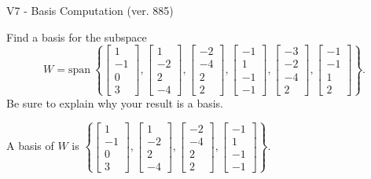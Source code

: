 \begin{exercise}
  \begin{exerciseTitle}V7 - Basis Computation (ver. 885)\end{exerciseTitle}
  \begin{exerciseStatement}
    Find a basis for the subspace 
\[W=\mathrm{span}\ \left\{\left[\begin{array}{r}
1 \\
-1 \\
0 \\
3
\end{array}\right] , \left[\begin{array}{r}
1 \\
-2 \\
2 \\
-4
\end{array}\right] , \left[\begin{array}{r}
-2 \\
-4 \\
2 \\
2
\end{array}\right] , \left[\begin{array}{r}
-1 \\
1 \\
-1 \\
-1
\end{array}\right] , \left[\begin{array}{r}
-3 \\
-2 \\
-4 \\
2
\end{array}\right] , \left[\begin{array}{r}
-1 \\
-1 \\
1 \\
2
\end{array}\right]\right\}.\]
 Be sure to explain why your result is a basis.


  \end{exerciseStatement}
  \begin{exerciseAnswer}
   A basis of \(W\) is  \(\left\{\left[\begin{array}{r}
1 \\
-1 \\
0 \\
3
\end{array}\right] , \left[\begin{array}{r}
1 \\
-2 \\
2 \\
-4
\end{array}\right] , \left[\begin{array}{r}
-2 \\
-4 \\
2 \\
2
\end{array}\right] , \left[\begin{array}{r}
-1 \\
1 \\
-1 \\
-1
\end{array}\right]\right\}\).
  


  \end{exerciseAnswer}
\end{exercise}